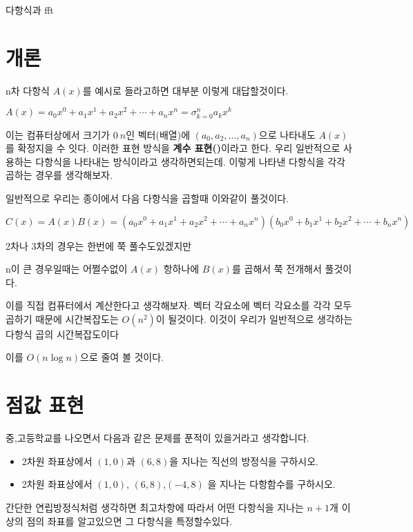 \usepackage{framed}

다항식과 fft

\section{개론}

n차 다항식 $A(x)$를 예시로 들라고하면 대부분 이렇게 대답할것이다.

$A(x) = a_0x^0 + a_1x^1 + a_2x^2 + \cdots + a_nx^n = \sigma_{k=0}^{n} a_kx^k$

이는 컴퓨터상에서 크기가 $0~n$인 벡터(배열)에 $(a_0,a_2, ... , a_n )$으로 나타내도 $A(x)$를 확정지을 수 잇다. 이러한 표현 방식을 \textbf{계수 표현()}이라고 한다.
우리 일반적으로 사용하는 다항식을 나타내는 방식이라고 생각하면되는데. 
이렇게 나타낸 다항식을 각각 곱하는 경우를 생각해보자.

일반적으로 우리는 종이에서 다음 다항식을 곱할때 이와같이 풀것이다.

$C(x) = A(x)B(x) = (a_0x^0 + a_1x^1 + a_2x^2 + \cdots + a_nx^n)(b_0x^0 + b_1x^1 + b_2x^2 + \cdots + b_nx^n)$ 

2차나 3차의 경우는 한번에 쭉 풀수도있겠지만

n이 큰 경우일때는 어쩔수없이 $A(x)$ 항하나에 $B(x)$를 곱해서 쭉 전개해서 풀것이다.

이를 직접 컴퓨터에서 계산한다고 생각해보자.
벡터 각요소에 벡터 각요소를 각각 모두 곱하기 때문에 시간복잡도는 $O(n^2)$이 될것이다. 이것이 우리가 일반적으로 생각하는 다항식 곱의 시간복잡도이다

이를 $O(n \log n)$으로 줄여 볼 것이다.

\section{점값 표현}

중,고등학교를 나오면서 다음과 같은 문제를 푼적이 있을거라고 생각합니다.

\begin{framed}
    \begin{itemize}
        \item 2차원 좌표상에서 $(1,0)$과 $(6,8)$을 지나는 직선의 방정식을 구하시오.
        \item 2차원 좌표상에서 $(1,0)$, $(6,8)$,$(-4,8)$ 을 지나는 다항함수를 구하시오.
    \end{itemize}
    
\end{framed}
간단한 연립방정식처럼 생각하면 최고차항에 따라서 어떤 다항식을 지나는 $n+1$개 이상의 점의 좌표를 알고있으면 그 다항식을 특정할수있다.

